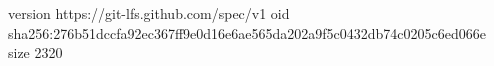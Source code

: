 version https://git-lfs.github.com/spec/v1
oid sha256:276b51dccfa92ec367ff9e0d16e6ae565da202a9f5c0432db74c0205c6ed066e
size 2320
